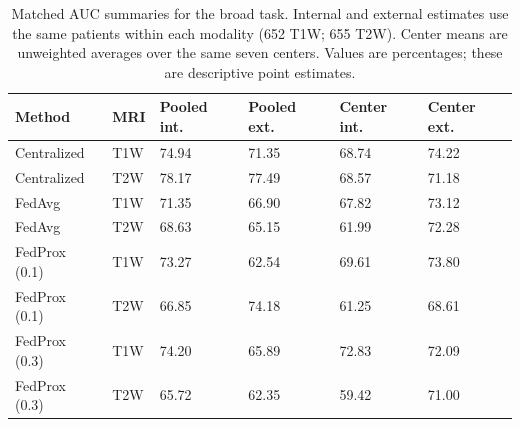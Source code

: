 \documentclass{article}
\newcommand{\zwrev}[1]{{\color{ZhixiangPink}#1}}
\begin{document}
\clearpage
\begin{table}[ht]
\centering
\caption{\zwrev{Matched AUC summaries for the broad task. Internal and external estimates use the same patients within each modality (652 T1W; 655 T2W). Center means are unweighted averages over the same seven centers. Values are percentages; these are descriptive point estimates.}}
\label{tab:zw-matched-auc}
{\color{ZhixiangPink}\small
\begin{tabular}{llllll}
\toprule
Method & MRI & Pooled int. & Pooled ext. & Center int. & Center ext.\\
\midrule
Centralized & T1W & 74.94 & 71.35 & 68.74 & 74.22\\
Centralized & T2W & 78.17 & 77.49 & 68.57 & 71.18\\
FedAvg & T1W & 71.35 & 66.90 & 67.82 & 73.12\\
FedAvg & T2W & 68.63 & 65.15 & 61.99 & 72.28\\
FedProx (0.1) & T1W & 73.27 & 62.54 & 69.61 & 73.80\\
FedProx (0.1) & T2W & 66.85 & 74.18 & 61.25 & 68.61\\
FedProx (0.3) & T1W & 74.20 & 65.89 & 72.83 & 72.09\\
FedProx (0.3) & T2W & 65.72 & 62.35 & 59.42 & 71.00\\
\bottomrule
\end{tabular}}
\end{table}
\end{document}
